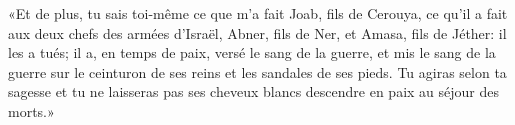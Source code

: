 «Et de plus, tu sais toi-même ce que m’a fait Joab, fils de Cerouya,
	ce qu’il a fait aux deux chefs des armées d’Israël,
		Abner, fils de Ner, et Amasa, fils de Jéther:
	il les a tués;
	il a, en temps de paix, versé le sang de la guerre,
	et mis le sang de la guerre sur le ceinturon de ses reins
		et les sandales de ses pieds.
Tu agiras selon ta sagesse
	et tu ne laisseras pas ses cheveux blancs descendre en paix au séjour des morts.»
